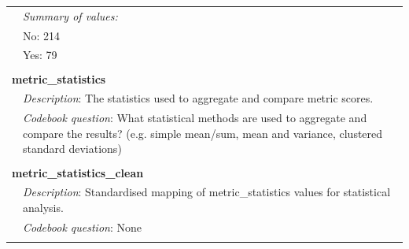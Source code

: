{\begin{longtable}{p{}p{}}
\\
& \textit{Summary of values:} \\
& No: 214 \\
& Yes: 79 \\
\\
\multicolumn{2}{l}{\textbf{metric\_statistics}} \\
& \textit{Description}: The statistics used to aggregate and compare metric scores. \\
& \textit{Codebook question}: What statistical methods are used to aggregate and compare the results? (e.g. simple mean/sum, mean and variance, clustered standard deviations) \\
\\
\multicolumn{2}{l}{\textbf{metric\_statistics\_clean}} \\
& \textit{Description}: Standardised mapping of metric\_statistics values for statistical analysis. \\
& \textit{Codebook question}: None \\
\\
\end{longtable}}

